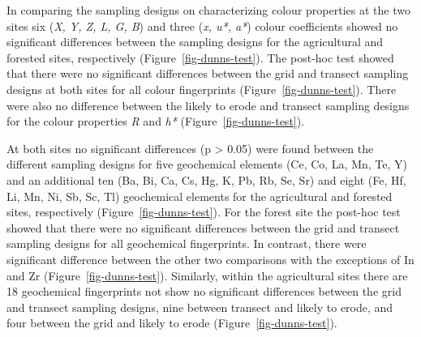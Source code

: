 \documentclass[
  number]{elsarticle}
\begin{document}
In comparing the sampling designs on characterizing colour properties at
the two sites six (\emph{X, Y, Z, L, G, B}) and three (\emph{x, u*, a*})
colour coefficients showed no significant differences between the
sampling designs for the agricultural and forested sites, respectively
(Figure~\ref{fig-dunns-test}). The post-hoc test showed that there were
no significant differences between the grid and transect sampling
designs at both sites for all colour fingerprints
(Figure~\ref{fig-dunns-test}). There were also no difference between the
likely to erode and transect sampling designs for the colour properties
\emph{R} and \emph{h*} (Figure~\ref{fig-dunns-test}).

At both sites no significant differences (p \textgreater{} 0.05) were
found between the different sampling designs for five geochemical
elements (Ce, Co, La, Mn, Te, Y) and an additional ten (Ba, Bi, Ca, Cs,
Hg, K, Pb, Rb, Se, Sr) and eight (Fe, Hf, Li, Mn, Ni, Sb, Sc, Tl)
geochemical elements for the agricultural and forested sites,
respectively (Figure~\ref{fig-dunns-test}). For the forest site the
post-hoc test showed that there were no significant differences between
the grid and transect sampling designs for all geochemical fingerprints.
In contrast, there were significant difference between the other two
comparisons with the exceptions of In and Zr
(Figure~\ref{fig-dunns-test}). Similarly, within the agricultural sites
there are 18 geochemical fingerprints not show no significant
differences between the grid and transect sampling designs, nine between
transect and likely to erode, and four between the grid and likely to
erode (Figure~\ref{fig-dunns-test}).
\end{document}
